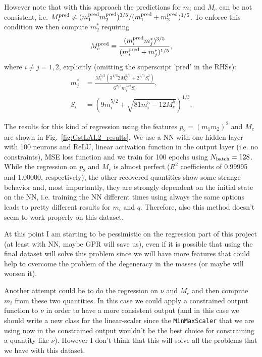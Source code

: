 \documentclass[prd,aps,twocolumn,a4paper,showkeys,nofootinbib]{revtex4-1}
\begin{document}
However note that with this approach the predictions for $m_i$ and $M_c$ can be not
consistent, i.e. 
$M_c^{\rm pred} \neq (m_1^{\rm pred} m_2^{\rm pred})^{3/5}/(m_1^{\rm pred} + m_2^{\rm pred})^{1/5}$.
To enforce this condition we then compute $m_2^*$ requiring 
\begin{equation}
M_c^{\rm pred} \equiv \frac{(m_i^{\rm pred} m_j^*)^{3/5}}{(m_i^{\rm pred} + m_j^{*})^{1/5}},
\end{equation}
where $i\neq j=1,2$, explicitly (omitting the superscript 'pred' in the RHSs):
\begin{align}
m_j^* &= \frac{M_c^{5/3}\left(3^{1/3} 2 M_c^{5/3}+2^{1/3} S_i^2 \right) }{ 6^{2/3} m_i^{3/2} S_i },  \\
S_i   &= \left(9 m_i^{5/2} + \sqrt{81 m_i^5 -12 M_c^5}\right)^{1/3}.
\end{align}

The results for this kind of regression using the features $p_2=(m_1 m_2)^2$ and $M_c$
are shown in Fig.~\ref{fig:GstLAL2_results}. We use a NN with one hidden layer with 
100 neurons and ReLU, linear activation function in the output layer (i.e. no constraints),
MSE loss function and we train for 100 epochs using $N_{\rm batch}=128$. 
While the regression on $p_2$ and $M_c$ is almost perfect ($R^2$ coefficients of 0.99995 and 
1.00000, respectively), the other recovered quantities show some strange behavior and, most
importantly, they are strongly dependent on the initial state on the NN, i.e. training the NN
different times using always the same options leads to pretty different results for $m_i$ and $q$.
Therefore, also this method doesn't seem to work properly on this dataset.

At this point I am starting to be pessimistic on the regression part of this project 
(at least with NN, maybe GPR will save us), even if it is possible that using the final dataset
will solve this problem since we will have more features that could help to overcome the problem
of the degeneracy in the masses (or maybe will worsen it). 

Another attempt could be to do the regression on $\nu$ and $M_c$ and then compute $m_i$
from these two quantities. 
In this case we could apply a constrained output function to $\nu$  in order to have a more
consistent output
(and in this case we should write a new class for the linear-scaler since the 
\texttt{MinMaxScaler} that we are using now in the constrained output wouldn't be the best 
choice for constraining a quantity like $\nu$). 
However I don't think that this will solve all the problems that we have
with this dataset.
\end{document}
